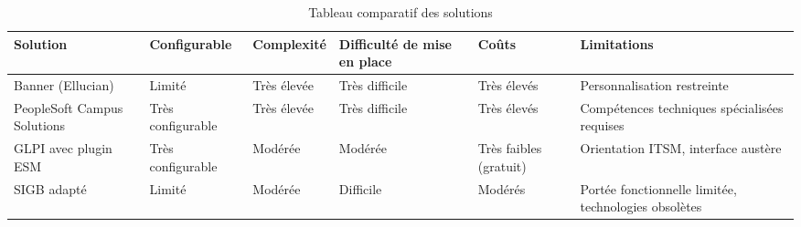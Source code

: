 \begin{table}[h]
\centering
\caption{Tableau comparatif des solutions}
\begin{tabular}{|p{3.5cm}|p{2.3cm}|p{2cm}|p{2.5cm}|p{2cm}|p{3cm}|}
\hline
\textbf{Solution} & \textbf{Configurable} & \textbf{Complexité} & \textbf{Difficulté de mise en place} & \textbf{Coûts} & \textbf{Limitations} \\
\hline
Banner (Ellucian) & Limité & Très élevée & Très difficile & Très élevés & Personnalisation restreinte \\
\hline
PeopleSoft Campus Solutions & Très configurable & Très élevée & Très difficile & Très élevés & Compétences techniques spécialisées requises \\
\hline
GLPI avec plugin ESM & Très configurable & Modérée & Modérée & Très faibles (gratuit) & Orientation ITSM, interface austère \\
\hline
SIGB adapté & Limité & Modérée & Difficile & Modérés & Portée fonctionnelle limitée, technologies obsolètes \\
\hline
\end{tabular}
\end{table}

